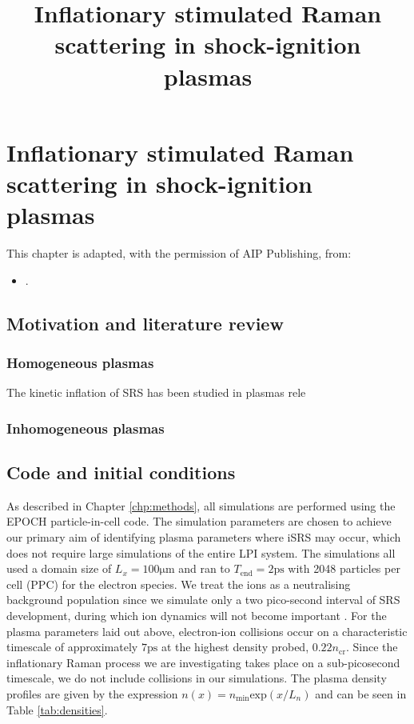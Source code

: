 
\chapter{Inflationary stimulated Raman scattering in shock-ignition plasmas}
\label{chp:iSRS}
%

\title{Inflationary stimulated Raman scattering in shock-ignition plasmas}

This chapter is adapted, with the permission of AIP Publishing, from:
\begin{itemize}
  \item {}.
\end{itemize}

\section{Motivation and literature review}


\subsection{Homogeneous plasmas}
The kinetic inflation of SRS has been studied in plasmas rele

\subsection{Inhomogeneous plasmas}


\section{Code and initial conditions}\label{sec:code&IC}
As described in Chapter \ref{chp:methods}, all simulations are performed using the EPOCH \cite{Arber2015} particle-in-cell code. The simulation parameters are chosen to achieve our primary aim of identifying plasma parameters where iSRS may occur, which does not require large simulations of the entire LPI system. The simulations all used a domain size of $L_x = 100\si{\micro\metre} $ and ran to $T_\mathrm{end} = 2\si{\pico\second}$
with 2048
particles per cell (PPC) for the electron species.
We treat the ions as a neutralising background population since we simulate only a two pico-second interval of SRS
development, during which ion dynamics will not become important \cite{Rousseaux2006}.
For the plasma parameters laid out above, electron-ion collisions occur on a characteristic timescale of approximately
$7 \si{\pico\second}$ at the highest density probed, $0.22n_\mathrm{cr}$. Since the inflationary Raman process we
are investigating takes place
on a sub-picosecond timescale, we do not include collisions in our simulations.
The plasma density profiles are given by the expression $n(x) = n_\mathrm{min}\mathrm{exp}(x/L_n)$ and can be seen in Table
\ref{tab:densities}.

